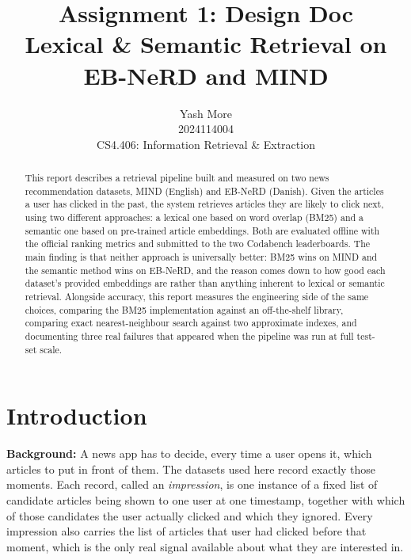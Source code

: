 \documentclass[11pt]{article}
\title{Assignment 1: Design Doc \\[0.3em]
       {\large Lexical \& Semantic Retrieval on EB-NeRD and MIND}}
\author{Yash More \\
  2024114004 \\
  CS4.406: Information Retrieval \& Extraction}
\begin{document}
\maketitle

\begin{abstract}
This report describes a retrieval pipeline built and measured on two news recommendation
datasets, MIND (English) and EB-NeRD (Danish). Given the articles a user has clicked in the
past, the system retrieves articles they are likely to click next, using two different
approaches: a lexical one based on word overlap (BM25) and a semantic one based on
pre-trained article embeddings. Both are evaluated offline with the official ranking metrics
and submitted to the two Codabench leaderboards. The main finding is that neither approach is
universally better: BM25 wins on MIND and the semantic method wins on EB-NeRD, and the reason
comes down to how good each dataset's provided embeddings are rather than anything inherent to
lexical or semantic retrieval. Alongside accuracy, this report measures the engineering side of
the same choices, comparing the BM25 implementation against an off-the-shelf library, comparing
exact nearest-neighbour search against two approximate indexes, and documenting three real
failures that appeared when the pipeline was run at full test-set scale.
\end{abstract}

\section{Introduction}

\textbf{Background:} A news app has to decide, every time a user opens it, which articles to put in front of them.
The datasets used here record exactly those moments. Each record, called an
\emph{impression}, is one instance of a fixed list of candidate articles being shown to one
user at one timestamp, together with which of those candidates the user actually clicked and
which they ignored. Every impression also carries the list of articles that user had clicked
before that moment, which is the only real signal available about what they are interested in.
\end{document}
